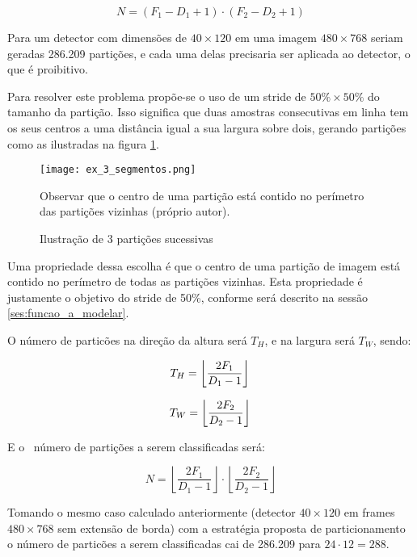 \begin{equation}
	N = (F_1 - D_1 + 1) \cdot (F_2 - D_2 + 1)
\end{equation}

Para um detector com dimensões  de $40 \times 120$ em uma imagem
$480 \times 768$ seriam geradas 286.209 partições, e cada uma delas precisaria
ser aplicada ao detector, o que é proibitivo.

Para resolver este problema propõe-se o uso de um stride de
$50\% \times 50\%$ do tamanho da partição. Isso significa que duas amostras
consecutivas em linha tem os seus centros a uma distância igual a sua
largura sobre dois, gerando partições como as ilustradas na figura
\ref{fig:ex_3_segmentos}.

\begin{figure}[!htb]
	\centering
	\texttt{[image: ex\_3\_segmentos.png]}
	\caption{Ilustração de 3 partições sucessivas}
	\label{fig:ex_3_segmentos}
	Observar que o centro de uma partição está contido no perímetro das
	partições vizinhas (próprio autor).
\end{figure}

Uma propriedade dessa escolha é que o centro de uma partição de imagem está
contido no perímetro de todas as partições vizinhas. Esta propriedade é
justamente o objetivo do stride de 50\%, conforme será descrito na sessão
\ref{ses:funcao_a_modelar}.

O número de particões na direção da altura será $T_H$, e na largura será
$T_W$, sendo:

\begin{equation}
	T_H=\left\lfloor \frac{2F_1}{D_1-1} \right\rfloor \\
\end{equation}

\begin{equation}
	T_W=\left\lfloor \frac{2F_2}{D_2-1} \right\rfloor \\
\end{equation}

E o  número de partições a serem classificadas será:

\begin{equation}
	N=\left\lfloor \frac{2F_1}{D_1-1} \right\rfloor \cdot
		\left\lfloor \frac{2F_2}{D_2-1} \right\rfloor
\end{equation}

Tomando o mesmo caso calculado anteriormente (detector $40 \times 120$ em
frames $480 \times 768$ sem extensão de borda) com a estratégia proposta
de particionamento o número de particões a serem classificadas cai de 286.209
para $24 \cdot 12=288$.

